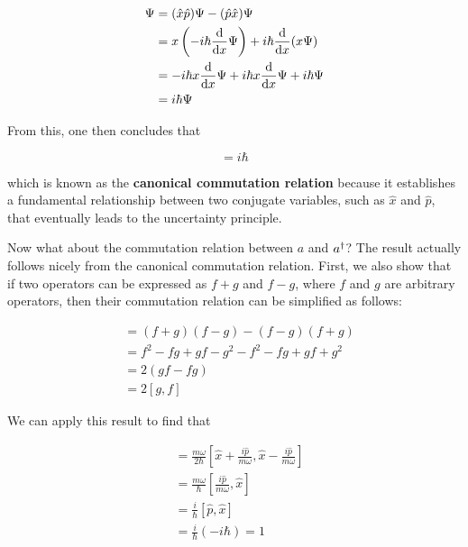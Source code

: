 \begin{align*}
	[\hat{x}, \hat{p}]\Psi &= (\hat{x}\hat{p})\Psi - (\hat{p}\hat{x})\Psi \\
	&= x\left(-i\hbar \dv{x}\Psi \right) + i\hbar \dv{x}(x\Psi) \\
	&= -i\hbar x \dv{x}\Psi + i\hbar x \dv{x}\Psi + i\hbar\Psi \\
	&= i\hbar\Psi 
\end{align*}

From this, one then concludes that 

\begin{tcolorbox}[title = Canonical commutation relation] \vspace{-2ex}
	\begin{equation}
		[\hat{x}, \hat{p}] = i\hbar
	\end{equation}
\end{tcolorbox}

\noindent which is known as the \textbf{canonical commutation relation} because it establishes a fundamental relationship between two conjugate variables, such as $\hat{x}$ and $\hat{p}$, that eventually leads to the uncertainty principle. 

Now what about the commutation relation between $a$ and $a^{\dagger}$? 
The result actually follows nicely from the canonical commutation relation. 
First, we also show that if two operators can be expressed as $f+g$ and $f-g$, where $f$ and $g$ are arbitrary operators, then their commutation relation can be simplified as follows:

\begin{align*}
	[f+g,f-g] &= (f+g)(f-g) - (f-g)(f+g) \\
	&= f^2 - fg + gf -g^2 - f^2 - fg + gf + g^2 \\
	&= 2(gf - fg) \\
	&= 2[g,f]
\end{align*}

We can apply this result to find that

\begin{align*}
	[a, \ad] &= \frac{m\omega}{2\hbar}\left[\hat{x} + \frac{i\hat{p}}{m\omega}, \hat{x} - \frac{i\hat{p}}{m\omega} \right] \\
	&= \frac{m\omega}{\hbar} \left[ \frac{i\hat{p}}{m\omega}, \hat{x} \right] \\
	&= \frac{i}{\hbar}[\hat{p},\hat{x}] \\
	&= \frac{i}{\hbar}(-i\hbar) = 1
\end{align*}

